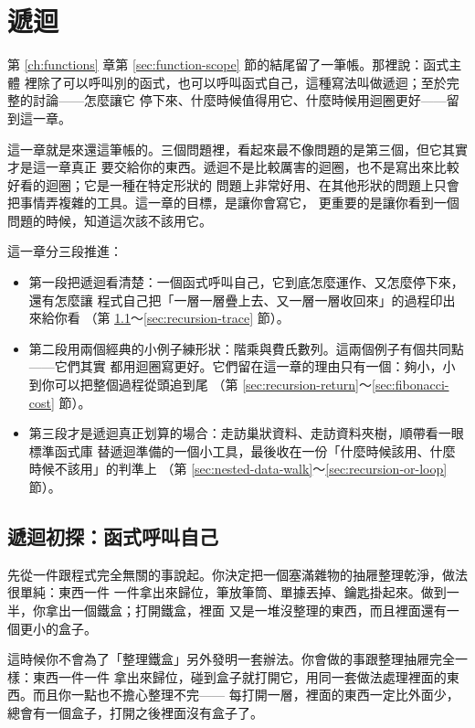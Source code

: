 \chapter{遞迴}
\label{ch:recursion}

第 \ref{ch:functions} 章第 \ref{sec:function-scope} 節的結尾留了一筆帳。那裡說：函式主體
裡除了可以呼叫別的函式，也可以呼叫函式自己，這種寫法叫做遞迴；至於完整的討論——怎麼讓它
停下來、什麼時候值得用它、什麼時候用迴圈更好——留到這一章。

這一章就是來還這筆帳的。三個問題裡，看起來最不像問題的是第三個，但它其實才是這一章真正
要交給你的東西。遞迴不是比較厲害的迴圈，也不是寫出來比較好看的迴圈；它是一種在特定形狀的
問題上非常好用、在其他形狀的問題上只會把事情弄複雜的工具。這一章的目標，是讓你會寫它，
更重要的是讓你看到一個問題的時候，知道這次該不該用它。

這一章分三段推進：

\begin{itemize}
\item 第一段把遞迴看清楚：一個函式呼叫自己，它到底怎麼運作、又怎麼停下來，還有怎麼讓
程式自己把「一層一層疊上去、又一層一層收回來」的過程印出來給你看
（第 \ref{sec:recursion-basics}～\ref{sec:recursion-trace} 節）。
\item 第二段用兩個經典的小例子練形狀：階乘與費氏數列。這兩個例子有個共同點——它們其實
都用迴圈寫更好。它們留在這一章的理由只有一個：夠小，小到你可以把整個過程從頭追到尾
（第 \ref{sec:recursion-return}～\ref{sec:fibonacci-cost} 節）。
\item 第三段才是遞迴真正划算的場合：走訪巢狀資料、走訪資料夾樹，順帶看一眼標準函式庫
替遞迴準備的一個小工具，最後收在一份「什麼時候該用、什麼時候不該用」的判準上
（第 \ref{sec:nested-data-walk}～\ref{sec:recursion-or-loop} 節）。
\end{itemize}

\section{遞迴初探：函式呼叫自己}
\label{sec:recursion-basics}

先從一件跟程式完全無關的事說起。你決定把一個塞滿雜物的抽屜整理乾淨，做法很單純：東西一件
一件拿出來歸位，筆放筆筒、單據丟掉、鑰匙掛起來。做到一半，你拿出一個鐵盒；打開鐵盒，裡面
又是一堆沒整理的東西，而且裡面還有一個更小的盒子。

這時候你不會為了「整理鐵盒」另外發明一套辦法。你會做的事跟整理抽屜完全一樣：東西一件一件
拿出來歸位，碰到盒子就打開它，用同一套做法處理裡面的東西。而且你一點也不擔心整理不完——
每打開一層，裡面的東西一定比外面少，總會有一個盒子，打開之後裡面沒有盒子了。

